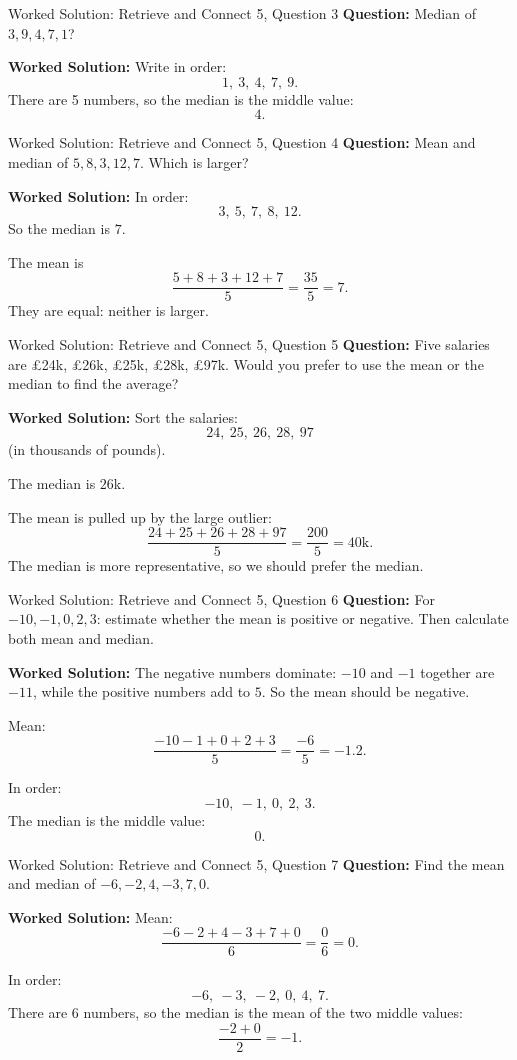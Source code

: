 \documentclass{beamer}
\begin{document}
\begin{frame}{Worked Solution: Retrieve and Connect 5, Question 3}
\textbf{Question:} Median of \(3, 9, 4, 7, 1\)?

\textbf{Worked Solution:}
Write in order:
\[
1,\ 3,\ 4,\ 7,\ 9.
\]
There are 5 numbers, so the median is the middle value:
\[
4.
\]
\end{frame}

\begin{frame}{Worked Solution: Retrieve and Connect 5, Question 4}
\textbf{Question:} Mean and median of \(5, 8, 3, 12, 7\). Which is larger?

\textbf{Worked Solution:}
In order:
\[
3,\ 5,\ 7,\ 8,\ 12.
\]
So the median is \(7\).

The mean is
\[
\frac{5 + 8 + 3 + 12 + 7}{5}
= \frac{35}{5}
= 7.
\]
They are equal: neither is larger.
\end{frame}

\begin{frame}{Worked Solution: Retrieve and Connect 5, Question 5}
\textbf{Question:} Five salaries are £24k, £26k, £25k, £28k, £97k. Would you prefer to use the mean or the median to find the average?

\textbf{Worked Solution:}
Sort the salaries:
\[
24,\ 25,\ 26,\ 28,\ 97
\]
(in thousands of pounds).

The median is \(26\)k.

The mean is pulled up by the large outlier:
\[
\frac{24 + 25 + 26 + 28 + 97}{5}
= \frac{200}{5}
= 40\text{k}.
\]
The median is more representative, so we should prefer the median.
\end{frame}

\begin{frame}{Worked Solution: Retrieve and Connect 5, Question 6}
\textbf{Question:} For \(-10, -1, 0, 2, 3\): estimate whether the mean is positive or negative. Then calculate both mean and median.

\textbf{Worked Solution:}
The negative numbers dominate: \(-10\) and \(-1\) together are \(-11\), while the positive numbers add to \(5\). So the mean should be negative.

Mean:
\[
\frac{-10 - 1 + 0 + 2 + 3}{5}
= \frac{-6}{5}
= -1.2.
\]

In order:
\[
-10,\ -1,\ 0,\ 2,\ 3.
\]
The median is the middle value:
\[
0.
\]
\end{frame}

\begin{frame}{Worked Solution: Retrieve and Connect 5, Question 7}
\textbf{Question:} Find the mean and median of \(-6, -2, 4, -3, 7, 0\).

\textbf{Worked Solution:}
Mean:
\[
\frac{-6 - 2 + 4 - 3 + 7 + 0}{6}
= \frac{0}{6}
= 0.
\]

In order:
\[
-6,\ -3,\ -2,\ 0,\ 4,\ 7.
\]
There are 6 numbers, so the median is the mean of the two middle values:
\[
\frac{-2 + 0}{2} = -1.
\]
\end{frame}
\end{document}

